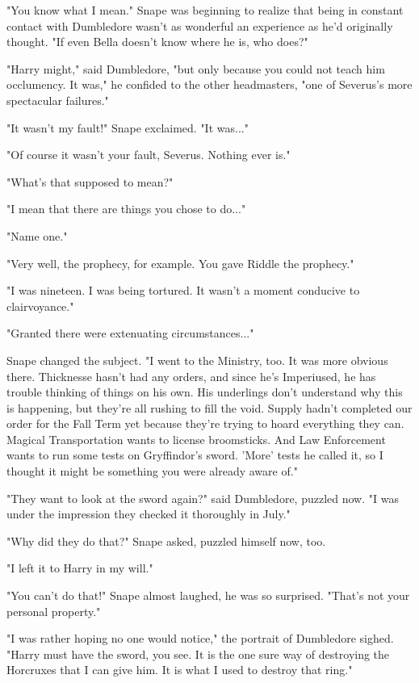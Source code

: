 \documentclass[a4paper,11pt]{article}
\begin{document}
"You know what I mean." Snape was beginning to realize that being in constant contact with Dumbledore wasn't as wonderful an experience as he'd originally thought. "If even Bella doesn't know where he is, who does?"

"Harry might," said Dumbledore, "but only because you could not teach him occlumency. It was," he confided to the other headmasters, "one of Severus's more spectacular failures."

"It wasn't my fault!" Snape exclaimed. "It was..."

"Of course it wasn't your fault, Severus. Nothing ever is."

"What's that supposed to mean?"

"I mean that there are things you chose to do..."

"Name one."

"Very well, the prophecy, for example. You gave Riddle the prophecy."

"I was nineteen. I was being tortured. It wasn't a moment conducive to clairvoyance."

"Granted there were extenuating circumstances..."

Snape changed the subject. "I went to the Ministry, too. It was more obvious there. Thicknesse hasn't had any orders, and since he's Imperiused, he has trouble thinking of things on his own. His underlings don't understand why this is happening, but they're all rushing to fill the void. Supply hadn't completed our order for the Fall Term yet because they're trying to hoard everything they can. Magical Transportation wants to license broomsticks. And Law Enforcement wants to run some tests on Gryffindor's sword. 'More' tests he called it, so I thought it might be something you were already aware of."

"They want to look at the sword again?" said Dumbledore, puzzled now. "I was under the impression they checked it thoroughly in July."

"Why did they do that?" Snape asked, puzzled himself now, too.

"I left it to Harry in my will."

"You can't do that!" Snape almost laughed, he was so surprised. "That's not your personal property."

"I was rather hoping no one would notice," the portrait of Dumbledore sighed. "Harry must have the sword, you see. It is the one sure way of destroying the Horcruxes that I can give him. It is what I used to destroy that ring."
\end{document}
